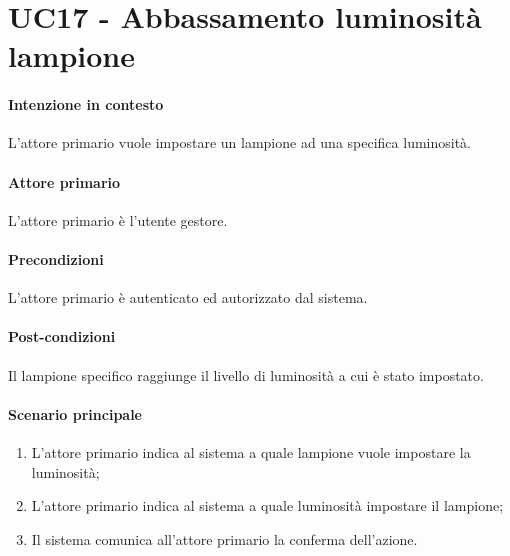 \section{UC17 - Abbassamento luminosità lampione}\label{uc:17}
\paragraph{Intenzione in contesto} L'attore primario vuole impostare un lampione ad una specifica luminosità.

\paragraph{Attore primario} L'attore primario è l'utente gestore.

\paragraph{Precondizioni}  L'attore primario è autenticato ed autorizzato dal sistema.

\paragraph{Post-condizioni} Il lampione specifico raggiunge il livello di luminosità a cui è stato impostato.
\paragraph{Scenario principale}
\begin{enumerate}
    \item L'attore primario indica al sistema a quale lampione vuole impostare la luminosità;
    \item L'attore primario indica al sistema a quale luminosità impostare il lampione;
    \item Il sistema comunica all'attore primario la conferma dell'azione.
\end{enumerate}